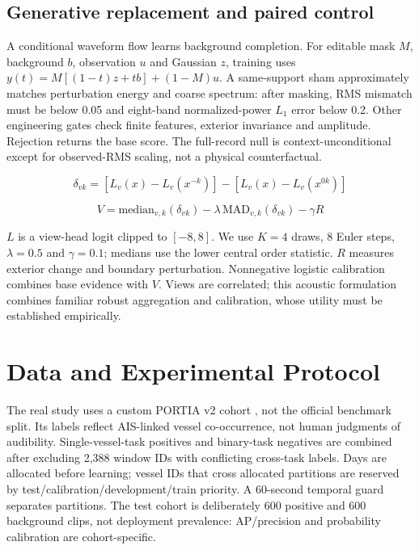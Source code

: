 \documentclass[11pt,letterpaper]{article}
\begin{document}
\subsection{Generative replacement and paired control}

A conditional waveform flow \cite{flowmatching} learns background completion. For editable mask \(M\), background \(b\), observation \(u\) and Gaussian \(z\), training uses \(y(t)=M[(1-t)z+tb]+(1-M)u\). A same-support sham approximately matches perturbation energy and coarse spectrum: after masking, RMS mismatch must be below 0.05 and eight-band normalized-power \(L_1\) error below 0.2. Other engineering gates check finite features, exterior invariance and amplitude. Rejection returns the base score. The full-record null is context-unconditional except for observed-RMS scaling, not a physical counterfactual.\par

\begin{equation}\label{eq:delta}
\delta_{vk}=[L_v(x)-L_v(x^{-k})]-[L_v(x)-L_v(x^{0k})]
\end{equation}

\begin{equation}\label{eq:score}
V=\mathrm{median}_{v,k}(\delta_{vk})-\lambda\,\mathrm{MAD}_{v,k}(\delta_{vk})-\gamma R
\end{equation}

\(L\) is a view-head logit clipped to \([-8,8]\). We use \(K=4\) draws, 8 Euler steps, \(\lambda=0.5\) and \(\gamma=0.1\); medians use the lower central order statistic. \(R\) measures exterior change and boundary perturbation. Nonnegative logistic calibration combines base evidence with \(V\). Views are correlated; this acoustic formulation combines familiar robust aggregation and calibration, whose utility must be established empirically.\par

\clearpage

\section{Data and Experimental Protocol}

The real study uses a custom PORTIA v2 cohort \cite{portia}, not the official benchmark split. Its labels reflect AIS-linked vessel co-occurrence, not human judgments of audibility. Single-vessel-task positives and binary-task negatives are combined after excluding 2,388 window IDs with conflicting cross-task labels. Days are allocated before learning; vessel IDs that cross allocated partitions are reserved by test/calibration/development/train priority. A 60-second temporal guard separates partitions. The test cohort is deliberately 600 positive and 600 background clips, not deployment prevalence: AP/precision and probability calibration are cohort-specific.\par
\end{document}
